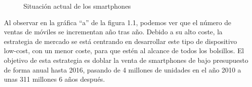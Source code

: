 \begin{figure}[h]
	\centering

	\caption{Situación actual de los smartphones}
\end{figure}

Al observar en la gráfica ``a'' de la figura 1.1, podemos ver que el número de ventas de móviles se incrementan año tras año. Debido a su alto coste, la estrategia de mercado se está centrando en desarrollar este tipo de dispositivo low-cost, con un menor coste, para que estén al alcance de todos los bolsillos. El objetivo de esta estrategia es doblar la venta de smartphones de bajo presupuesto de forma anual hasta 2016, pasando de 4 millones de unidades en el año 2010 a unas 311 millones 6 años después.
\newline

